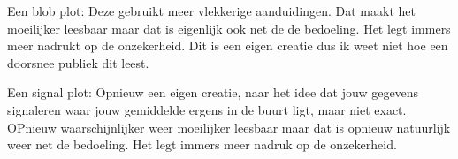 \documentclass{SVnote}
\newcommand\graph{}
\newcommand\drawgraph{}
\begin{document}
\renewcommand\graph[2]{
	\begin{tikzpicture}[x=.01\linewidth,y=1ex]
	\useasboundingbox (0,0) rectangle (100,1);
	\fill[gray1, use as bounding box] (0,0) rectangle (100,1ex);
	\fill[maincol2] (#1,0) +(-#2,0) rectangle +(#2,1ex);
	\draw[gray1,line width=1pt] (#1,0) -- +(-0,1ex);
	\end{tikzpicture}
	}	
\drawgraph





Een blob plot: Deze gebruikt meer vlekkerige aanduidingen. Dat maakt het moeilijker leesbaar maar dat is eigenlijk ook net de de bedoeling. Het legt immers meer nadrukt op de onzekerheid. Dit is een eigen creatie dus ik weet niet hoe een doorsnee publiek dit leest.


Een signal plot: Opnieuw een eigen creatie, naar het idee dat jouw gegevens signaleren waar jouw gemiddelde ergens in de buurt ligt, maar niet exact. OPnieuw waarschijnlijker weer moeilijker leesbaar maar dat is opnieuw natuurlijk weer net de bedoeling. Het legt immers meer nadruk op de onzekerheid.

\renewcommand\graph[2]{
	\begin{tikzpicture}[x=.01\linewidth,y=.6ex]
	\useasboundingbox (0,-.5ex) rectangle (100,.5ex);
	\draw[maincol1] #2;
	\end{tikzpicture}
	}	
\end{document}
